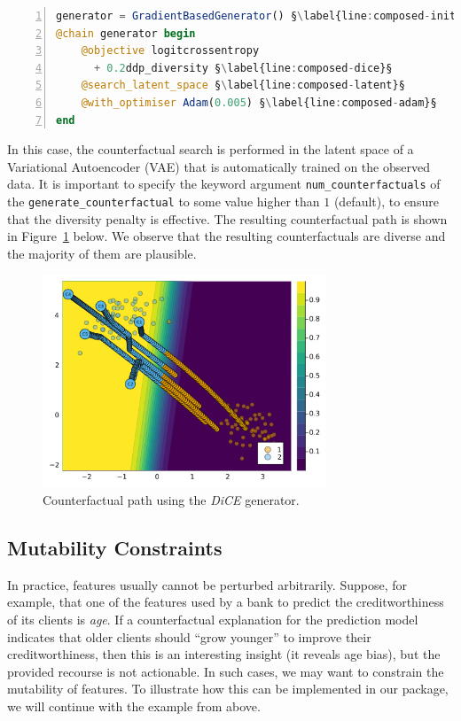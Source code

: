 \documentclass[
  letterpaper,
  DIV=11,
  numbers=noendperiod]{scrartcl}
\begin{document}
\begin{lstlisting}[language=Julia, escapechar=§, numbers=left, label={lst:composed}, caption={Composing a custom generator.}]
generator = GradientBasedGenerator() §\label{line:composed-init}§
@chain generator begin
    @objective logitcrossentropy 
      + 0.2ddp_diversity §\label{line:composed-dice}§
    @search_latent_space §\label{line:composed-latent}§
    @with_optimiser Adam(0.005) §\label{line:composed-adam}§
end
\end{lstlisting}

In this case, the counterfactual search is performed in the latent space
of a Variational Autoencoder (VAE) that is automatically trained on the
observed data. It is important to specify the keyword argument
\texttt{num\_counterfactuals} of the \texttt{generate\_counterfactual}
to some value higher than \(1\) (default), to ensure that the diversity
penalty is effective. The resulting counterfactual path is shown in
Figure~\ref{fig-binary-advanced} below. We observe that the resulting
counterfactuals are diverse and the majority of them are plausible.

\begin{figure}

{\centering \includegraphics[width=3.33333in,height=2.5in]{www/binary_advanced.png}

}

\caption{\label{fig-binary-advanced}Counterfactual path using the
\emph{DiCE} generator.}

\end{figure}

\hypertarget{sec-mut}{%
\subsection{Mutability Constraints}\label{sec-mut}}

In practice, features usually cannot be perturbed arbitrarily. Suppose,
for example, that one of the features used by a bank to predict the
creditworthiness of its clients is \emph{age}. If a counterfactual
explanation for the prediction model indicates that older clients should
``grow younger'' to improve their creditworthiness, then this is an
interesting insight (it reveals age bias), but the provided recourse is
not actionable. In such cases, we may want to constrain the mutability
of features. To illustrate how this can be implemented in our package,
we will continue with the example from above.
\end{document}
